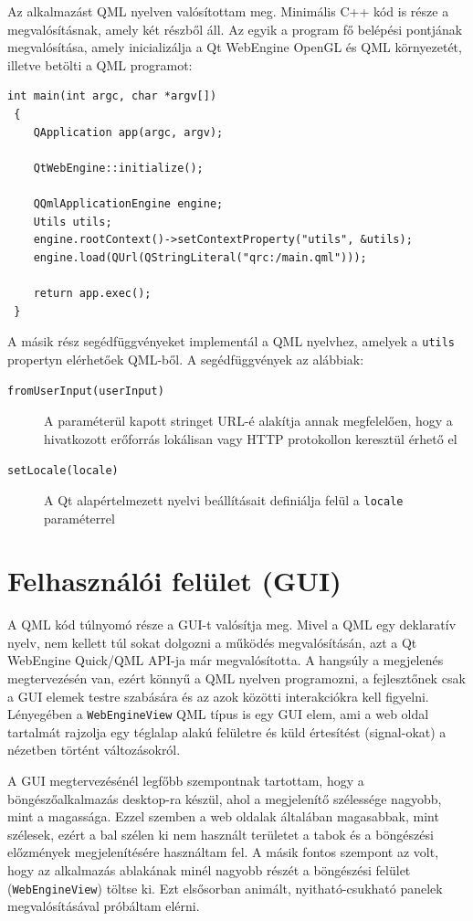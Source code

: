 \documentclass[12pt]{report}
\begin{document}
Az alkalmazást QML nyelven valósítottam meg. Minimális C++ kód is része a megvalósításnak,
amely két részből áll. Az egyik a program fő belépési pontjának megvalósítása, amely
inicializálja a Qt WebEngine OpenGL és QML környezetét, illetve betölti a QML programot:
\begin{lstlisting}[title=main.cpp]
 int main(int argc, char *argv[])
 {
    QApplication app(argc, argv);

    QtWebEngine::initialize();

    QQmlApplicationEngine engine;
    Utils utils;
    engine.rootContext()->setContextProperty("utils", &utils);
    engine.load(QUrl(QStringLiteral("qrc:/main.qml")));

    return app.exec();
 }
\end{lstlisting}
A másik rész segédfüggvényeket implementál a QML nyelvhez, amelyek a \texttt{utils} propertyn
elérhetőek QML-ből. A segédfüggvények az alábbiak:
\begin{description}
    \item[\texttt{fromUserInput(userInput)}] A paraméterül kapott stringet URL-é alakítja
        annak megfelelően, hogy a hivatkozott erőforrás lokálisan vagy HTTP protokollon
        keresztül érhető el
    \item[\texttt{setLocale(locale)}] A Qt alapértelmezett nyelvi beállításait definiálja
        felül a \texttt{locale} paraméterrel
\end{description}

\section{Felhasználói felület (GUI)}

A QML kód túlnyomó része a GUI-t valósítja meg. Mivel a QML egy deklaratív nyelv, nem kellett
túl sokat dolgozni a működés megvalósításán, azt a Qt WebEngine Quick/QML API-ja már
megvalósította. A hangsúly a megjelenés megtervezésén van, ezért könnyű a QML nyelven
programozni, a fejlesztőnek csak a GUI elemek testre szabására és az azok közötti
interakciókra kell figyelni. Lényegében a \texttt{WebEngineView} QML típus is egy GUI elem,
ami a web oldal tartalmát rajzolja egy téglalap alakú felületre és küld értesítést
(signal-okat) a nézetben történt változásokról.

A GUI megtervezésénél legfőbb szempontnak tartottam, hogy a böngészőalkalmazás desktop-ra
készül, ahol a megjelenítő szélessége nagyobb, mint a magassága. Ezzel szemben a web oldalak
általában magasabbak, mint szélesek, ezért a bal szélen ki nem használt területet a tabok
és a böngészési előzmények megjelenítésére használtam fel. A másik fontos szempont az volt,
hogy az alkalmazás ablakának minél nagyobb részét a böngészési felület
(\texttt{WebEngineView}) töltse ki. Ezt elsősorban animált, nyitható-csukható panelek
megvalósításával próbáltam elérni.
\end{document}
